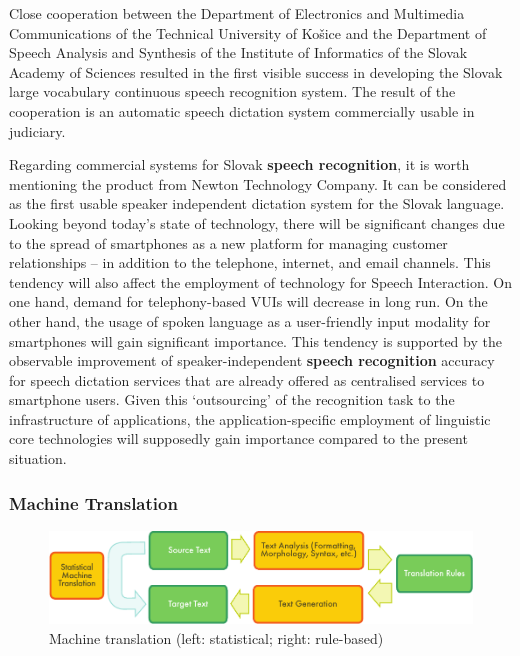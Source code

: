 \begin{multicols}{2}
Close cooperation between the Department of Electronics and Multimedia Communications of the Technical University of Košice and the Department of Speech Analysis and Synthesis of the Institute of Informatics of the Slovak Academy of Sciences resulted in the first visible success in developing the Slovak large vocabulary continuous speech recognition system. The result of the cooperation is an automatic speech dictation system commercially usable in judiciary.

Regarding commercial systems for Slovak \textbf{speech recognition}, it is worth mentioning the product from Newton Technology Company. It can be considered as the first usable speaker independent dictation system for the Slovak language.
Looking beyond today’s state of technology, there will be significant changes due to the spread of smartphones as a new platform for managing customer relationships – in addition to the telephone, internet, and email channels. This tendency will also affect the employment of technology for Speech Interaction. On one hand, demand for telephony-based VUIs will decrease in long run. On the other hand, the usage of spoken language as a user-friendly input modality for smartphones will gain significant importance. This tendency is supported by the observable improvement of speaker-independent \textbf{speech recognition} accuracy for speech dictation services that are already offered as centralised services to smartphone users. Given this ‘outsourcing’ of the recognition task to the infrastructure of applications, the application-specific employment of linguistic core technologies will supposedly gain importance compared to the present situation. 

\subsubsection{Machine Translation}

\begin{figure}[htb]
  \center
  \includegraphics[width=\textwidth]{../_media/english/machine_translation}
  \caption{Machine translation (left: statistical; right: rule-based)}
  \label{fig:mtarch_en}
\end{figure}


\end{multicols}
